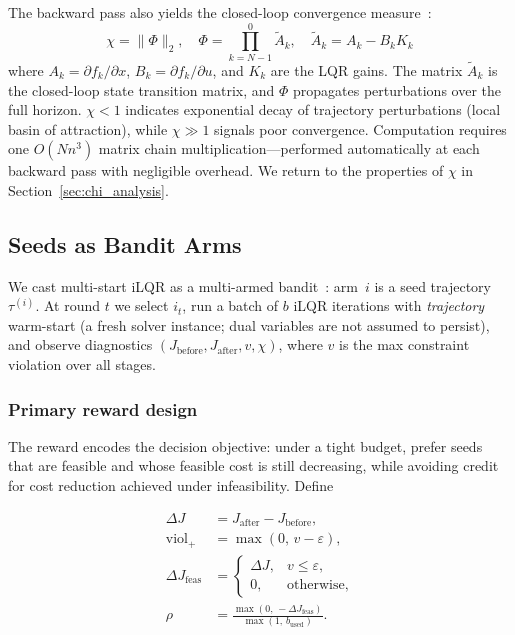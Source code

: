 \documentclass[lettersize,journal]{IEEEtran}
\begin{document}
The backward pass also yields the closed-loop convergence measure~\cite{zhu2024}:
\begin{equation}
\chi = \|\Phi\|_2, \quad \Phi = \prod_{k=N-1}^{0} \tilde{A}_k, \quad \tilde{A}_k = A_k - B_k K_k
\label{eq:chi_def}
\end{equation}
where $A_k = \partial f_k/\partial x$, $B_k = \partial f_k/\partial u$, and $K_k$ are the LQR gains.
The matrix $\tilde{A}_k$ is the closed-loop state transition matrix, and $\Phi$ propagates perturbations over the full horizon. $\chi < 1$ indicates exponential decay of trajectory perturbations (local basin of attraction), while $\chi \gg 1$ signals poor convergence. Computation requires one $O(N n^3)$ matrix chain multiplication---performed automatically at each backward pass with negligible overhead.  We return to the properties of $\chi$ in Section~\ref{sec:chi_analysis}.

\subsection{Seeds as Bandit Arms}

We cast multi-start iLQR as a multi-armed bandit~\cite{auer2002}: arm~$i$ is a
seed trajectory $\tau^{(i)}$. At round $t$ we select $i_t$, run a batch of $b$
iLQR iterations with \emph{trajectory} warm-start (a fresh solver instance;
dual variables are not assumed to persist), and observe diagnostics
$(J_{\mathrm{before}}, J_{\mathrm{after}}, v, \chi)$, where $v$ is the max
constraint violation over all stages.

\subsubsection{Primary reward design}

The reward encodes the decision objective: under a tight budget, prefer seeds that are feasible and whose feasible cost is still decreasing, while avoiding credit for cost reduction achieved under infeasibility.  Define

\begin{align*}
\Delta J &= J_{\mathrm{after}}-J_{\mathrm{before}},\\
\mathrm{viol}_+ &= \max(0,\,v-\varepsilon),\\
\Delta J_{\mathrm{feas}} &=
\begin{cases}
\Delta J, & v \le \varepsilon,\\
0, & \text{otherwise},
\end{cases}\\[2pt]
\rho &= \frac{\max(0,\,-\Delta J_{\mathrm{feas}})}{\max(1,\,b_{\mathrm{used}})}.
\end{align*}
\end{document}
